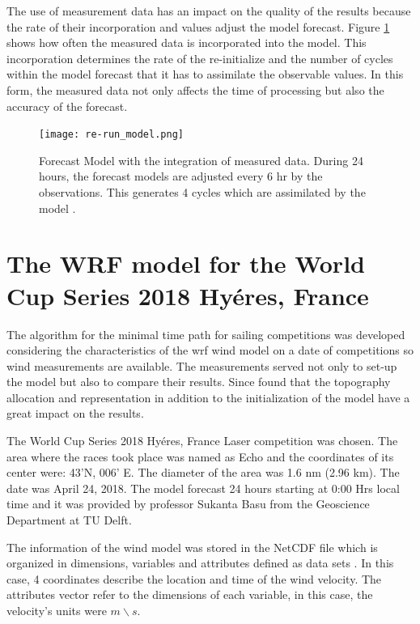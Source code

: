 The use of measurement data has an impact on the quality of the results because the rate of their incorporation and values adjust the model forecast. Figure \ref{fig:data_meas_integration} shows how often the measured data is incorporated into the model. This incorporation determines the rate of the re-initialize and the number of cycles within the model forecast that it has to assimilate the observable values. In this form, the measured data not only affects the time of processing but also the accuracy of the forecast. \par

\begin{figure}
    \centering
    \texttt{[image: re-run\_model.png]}
    \caption{Forecast Model with the integration of measured data. During 24 hours, the forecast models are adjusted every 6 hr by the observations. This generates 4 cycles which are assimilated by the model \cite{warner2010numerical}. }
    \label{fig:data_meas_integration}
\end{figure}

\section{The WRF model for the World Cup Series 2018 Hyéres, France}\label{sec:WRF_WindM_FR}

The algorithm for the minimal time path for sailing competitions was developed considering the characteristics of the \acrshort{wrf} wind model on a date of competitions so wind measurements are available. The measurements served not only to set-up the model but also to compare their results. Since \cite{giannaros2018ultrahigh} found that the topography allocation and representation in addition to the initialization of the model have a great impact on the results. \par

The World Cup Series 2018 Hyéres, France Laser competition was chosen. The area where the races took place was named as Echo and the coordinates of its center were: 43'N, 006' E. The diameter of the area was 1.6 nm (2.96 km). The date was April 24, 2018. The model forecast 24 hours starting at 0:00 Hrs local time and it was provided by professor Sukanta Basu from the Geoscience Department at TU Delft. \par 
The information of the wind model was stored in the NetCDF file which is organized in dimensions, variables and attributes defined as data sets \cite{netcdf56302}. In this case, 4 coordinates describe the location and time of the wind velocity. The attributes vector refer to the dimensions of each variable, in this case, the velocity's units were $m \backslash s $. \par 

